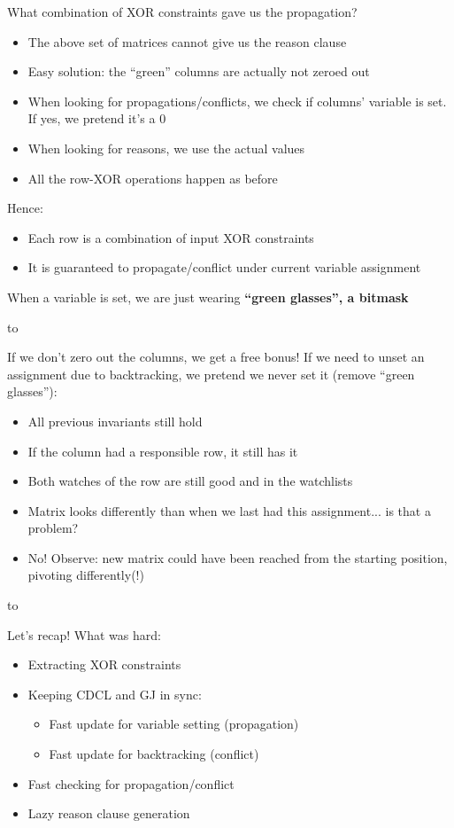 \documentclass[aspectratio=196]{slides}
\def\TITLE#1{\hbox to \linewidth{\large #1\hfill}}
\def\BOTTOM{\vfill\newpage}
\def\SLIDE#1{\BOTTOM\TITLE{#1}}
\begin{document}
What combination of XOR constraints gave us the propagation?
\begin{itemize}
\item The above set of matrices cannot give us the reason clause
\item Easy solution: the ``green'' columns are actually not zeroed out
\item When looking for propagations/conflicts, we check if columns' variable is set. If yes, we pretend it's a 0
\item When looking for reasons, we use the actual values
\item All the row-XOR operations happen as before
\end{itemize}

Hence:
\begin{itemize}
\item Each row is a combination of input XOR constraints
\item It is guaranteed to propagate/conflict under current variable assignment
\end{itemize}

When a variable is set, we are just wearing \textbf{``green glasses'', a bitmask}

\vfill
\newpage
\SLIDE{CDCL(T) Gauss-Jordan Elimination: Backtracking}
\vspace{2ex}


If we don't zero out the columns, we get a free bonus! If we need to unset an assignment due to backtracking, we pretend we never set it (remove ``green glasses''):
\begin{itemize}
\item All previous invariants still hold
\item If the column had a responsible row, it still has it
\item Both watches of the row are still good and in the watchlists
\item Matrix looks differently than when we last had this assignment... is that a problem?
\item No! Observe: new matrix could have been reached from the starting position, pivoting differently(!)
\end{itemize}
\vfill
\newpage
\SLIDE{CDCL(T) Gauss-Jordan Elimination: Recap}
\vspace{2ex}

Let's recap! What was hard:
\begin{itemize}
\item Extracting XOR constraints
\item Keeping CDCL and GJ in sync:
\begin{itemize}
\item Fast update for variable setting (propagation)
\item Fast update for backtracking (conflict)
\end{itemize}
\item Fast checking for propagation/conflict
\item Lazy reason clause generation
\end{itemize}
\end{document}

